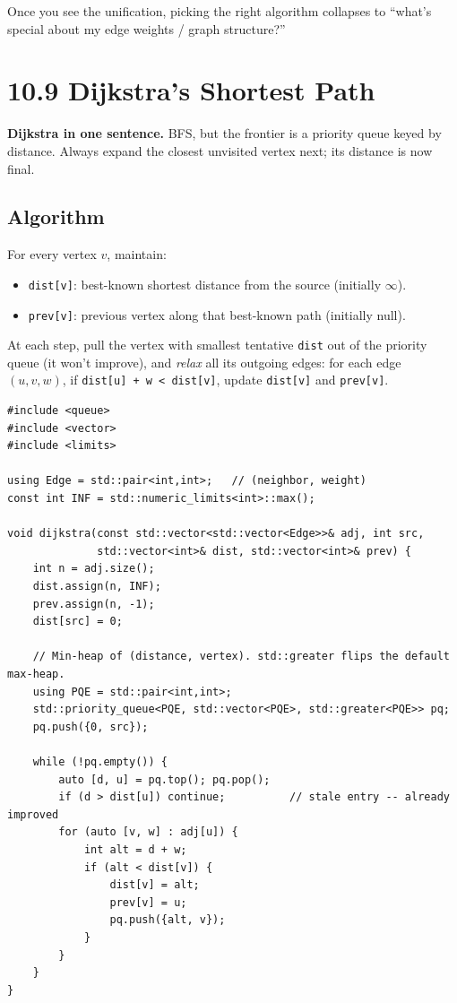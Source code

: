 \documentclass[11pt]{article}
\begin{document}
Once you see the unification, picking the right algorithm collapses
to ``what's special about my edge weights / graph structure?''

\section{10.9 Dijkstra's Shortest Path}

\begin{ideabox}
\textbf{Dijkstra in one sentence.} BFS, but the frontier is a priority queue keyed by distance. Always expand the closest unvisited vertex next; its distance is now final.
\end{ideabox}

\subsection*{Algorithm}

For every vertex $v$, maintain:
\begin{itemize}[leftmargin=*]
    \item \texttt{dist[v]}: best-known shortest distance from the source (initially $\infty$).
    \item \texttt{prev[v]}: previous vertex along that best-known path (initially null).
\end{itemize}

At each step, pull the vertex with smallest tentative \texttt{dist} out of the priority queue (it won't improve), and \emph{relax} all its outgoing edges: for each edge $(u, v, w)$, if \texttt{dist[u] + w < dist[v]}, update \texttt{dist[v]} and \texttt{prev[v]}.

\begin{lstlisting}[basicstyle=\ttfamily\small,frame=single]
#include <queue>
#include <vector>
#include <limits>

using Edge = std::pair<int,int>;   // (neighbor, weight)
const int INF = std::numeric_limits<int>::max();

void dijkstra(const std::vector<std::vector<Edge>>& adj, int src,
              std::vector<int>& dist, std::vector<int>& prev) {
    int n = adj.size();
    dist.assign(n, INF);
    prev.assign(n, -1);
    dist[src] = 0;

    // Min-heap of (distance, vertex). std::greater flips the default max-heap.
    using PQE = std::pair<int,int>;
    std::priority_queue<PQE, std::vector<PQE>, std::greater<PQE>> pq;
    pq.push({0, src});

    while (!pq.empty()) {
        auto [d, u] = pq.top(); pq.pop();
        if (d > dist[u]) continue;          // stale entry -- already improved
        for (auto [v, w] : adj[u]) {
            int alt = d + w;
            if (alt < dist[v]) {
                dist[v] = alt;
                prev[v] = u;
                pq.push({alt, v});
            }
        }
    }
}
\end{lstlisting}
\end{document}
